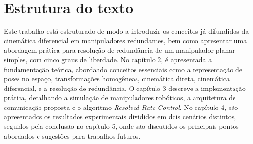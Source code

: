 \section{Estrutura do texto}\label{sec:structure}

Este trabalho está estruturado de modo a introduzir os conceitos já difundidos da cinemática diferencial em manipuladores redundantes,
bem como apresentar uma abordagem prática para resolução de redundância de um manipulador planar simples, com cinco graus de liberdade.
No capítulo 2, é apresentada a fundamentação teórica, abordando conceitos essenciais como a representação de poses no
espaço, transformações homogêneas, cinemática direta, cinemática diferencial, e a resolução de redundância.
O capítulo 3 descreve a implementação prática, detalhando a simulação de manipuladores robóticos, a arquitetura de comunicação proposta
e o algoritmo \emph{Resolved Rate Control}. No capítulo 4, são apresentados os resultados experimentais divididos em dois cenários
distintos, seguidos pela conclusão no capítulo 5, onde são discutidos os principais pontos abordados e sugestões para trabalhos futuros.
